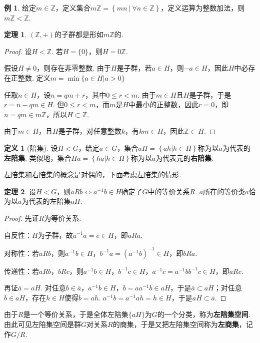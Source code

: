 \documentclass[12pt]{ctexart}
\theoremstyle{definition}
\newtheorem{definition}{定义}
\newtheorem{theorem}{定理}
\newtheorem{example}{例}
\theoremstyle{plain}
\begin{document}
	\begin{example}
		给定$m\in\mathbb{Z}$，定义集合$m\mathbb{Z}=\left\{mn\ |\ \forall n\in\mathbb{Z}\right\}$，定义运算为整数加法，则$m\mathbb{Z}<\mathbb{Z}$.
	\end{example}
	\begin{theorem}
		$(\mathbb{Z},+)$的子群都是形如$m\mathbb{Z}$的.
	\end{theorem}
	\begin{proof}
		设$H<\mathbb{Z}$. 若$H=\{0\}$，则$H=0\mathbb{Z}$.
		
		假设$H\neq {0}$，则存在非零整数. 由于$H$是子群，若$a\in H$，则$-a \in H$，因此$H$中必存在正整数. 定义$m=\min\{a\in H|a>0\}$
		
		任取$n\in H$，设$n=qm+r$，其中$0\leqslant r<m$. 由于$m\in H$且$H$是子群，于是$r=n-qm\in H$. 但$0\leqslant r<m$，而$m$是$H$中最小的正整数，因此$r=0$，即$n=qm\in m\mathbb{Z}$，所以$H\subset\mathbb{Z}$.
		
		由于$m\in H$，且$H$是子群，对任意整数$k$，有$km\in H$，因此$\mathbb{Z}\subset H$.		
	\end{proof}
	\begin{definition}[陪集]
		设$H<G$，给定$a\in G$，集合$aH=\left\{ah|h\in H\right\}$称为以$a$为代表的\textbf{左陪集}. 类似地，集合$Ha=\left\{ha|h\in H\right\}$称为以$a$为代表元的\textbf{右陪集}.
	\end{definition}
	左陪集和右陪集的概念是对偶的，下面考虑左陪集的情形.
	\begin{theorem}
		设$H<G$，则$aRb\iff a^{-1}b\in H$确定了$G$中的等价关系$R$. $a$所在的等价类$\overline{a}$恰为以$a$为代表的左陪集$aH$.
	\end{theorem}
	\begin{proof}
		先证$R$为等价关系.
		
		自反性：$H$为子群，故$a^{-1}a=e\in H$，即$aRa$.
		
		对称性：若$aRb$，则$a^{-1}b\in H$，$b^{-1}a=\left(a^{-1}b\right)^{-1}\in H$，即$bRa$.
		
		传递性：若$aRb$，$bRc$，则$a^{-1}b\in H$，$b^{-1}c\in H$，$a^{-1}c=a^{-1}bb^{-1}c\in H$，即$aRc$.
		
		再证$\overline{a}=aH$. 对任意$b\in\overline{a}$，$a^{-1}b\in H$，$b=aa^{-1}b\in aH$，于是$\overline{a}\subset aH$；对任意$b\in aH$，存在$h\in H$使得$b=ah$. $a^{-1}b=a^{-1}ah=h\in H$，于是$aH\subset\overline{a}$.
	\end{proof}
	由于$R$是一个等价关系，于是全体左陪集$\{aH\}$为$G$的一个分类，称为\textbf{左陪集空间}. 由此可见左陪集空间是群$G$对关系$R$的商集，于是又把左陪集空间称为\textbf{左商集}，记作$G/R$.
\end{document}
